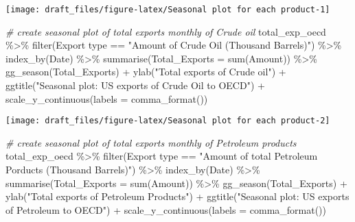 \documentclass[
]{article}
\newenvironment{Shaded}{\begin{snugshade}}{\end{snugshade}}
\newcommand{\AttributeTok}[1]{\textcolor[rgb]{0.77,0.63,0.00}{#1}}
\newcommand{\CommentTok}[1]{\textcolor[rgb]{0.56,0.35,0.01}{\textit{#1}}}
\newcommand{\FunctionTok}[1]{\textcolor[rgb]{0.00,0.00,0.00}{#1}}
\newcommand{\NormalTok}[1]{#1}
\newcommand{\SpecialCharTok}[1]{\textcolor[rgb]{0.00,0.00,0.00}{#1}}
\newcommand{\StringTok}[1]{\textcolor[rgb]{0.31,0.60,0.02}{#1}}
\begin{document}
\begin{center}\texttt{[image: draft\_files/figure-latex/Seasonal plot for each product-1]} \end{center}

\begin{Shaded}
\begin{Highlighting}[]
\CommentTok{\# create seasonal plot of total exports monthly of Crude oil}
\NormalTok{total\_exp\_oecd }\SpecialCharTok{\%\textgreater{}\%} \FunctionTok{filter}\NormalTok{(}\StringTok{\textasciigrave{}}\AttributeTok{Export type}\StringTok{\textasciigrave{}} \SpecialCharTok{==} \StringTok{"Amount of Crude Oil (Thousand Barrels)"}\NormalTok{) }\SpecialCharTok{\%\textgreater{}\%} 
  \FunctionTok{index\_by}\NormalTok{(Date) }\SpecialCharTok{\%\textgreater{}\%} 
  \FunctionTok{summarise}\NormalTok{(}\AttributeTok{Total\_Exports =} \FunctionTok{sum}\NormalTok{(}\StringTok{\textasciigrave{}}\AttributeTok{Amount}\StringTok{\textasciigrave{}}\NormalTok{)) }\SpecialCharTok{\%\textgreater{}\%} 
  \FunctionTok{gg\_season}\NormalTok{(Total\_Exports) }\SpecialCharTok{+}
  \FunctionTok{ylab}\NormalTok{(}\StringTok{"Total exports  of Crude oil"}\NormalTok{) }\SpecialCharTok{+}
  \FunctionTok{ggtitle}\NormalTok{(}\StringTok{"Seasonal plot: US exports of Crude Oil to OECD"}\NormalTok{) }\SpecialCharTok{+}
  \FunctionTok{scale\_y\_continuous}\NormalTok{(}\AttributeTok{labels =} \FunctionTok{comma\_format}\NormalTok{())}
\end{Highlighting}
\end{Shaded}

\begin{center}\texttt{[image: draft\_files/figure-latex/Seasonal plot for each product-2]} \end{center}

\begin{Shaded}
\begin{Highlighting}[]
\CommentTok{\# create seasonal plot of total exports monthly of Petroleum products}
\NormalTok{total\_exp\_oecd }\SpecialCharTok{\%\textgreater{}\%} \FunctionTok{filter}\NormalTok{(}\StringTok{\textasciigrave{}}\AttributeTok{Export type}\StringTok{\textasciigrave{}} \SpecialCharTok{==} \StringTok{"Amount of total Petroleum Porducts (Thousand Barrels)"}\NormalTok{) }\SpecialCharTok{\%\textgreater{}\%} 
  \FunctionTok{index\_by}\NormalTok{(Date) }\SpecialCharTok{\%\textgreater{}\%} 
  \FunctionTok{summarise}\NormalTok{(}\AttributeTok{Total\_Exports =} \FunctionTok{sum}\NormalTok{(}\StringTok{\textasciigrave{}}\AttributeTok{Amount}\StringTok{\textasciigrave{}}\NormalTok{)) }\SpecialCharTok{\%\textgreater{}\%} 
  \FunctionTok{gg\_season}\NormalTok{(Total\_Exports) }\SpecialCharTok{+}
  \FunctionTok{ylab}\NormalTok{(}\StringTok{"Total exports  of Petroleum Products"}\NormalTok{) }\SpecialCharTok{+}
  \FunctionTok{ggtitle}\NormalTok{(}\StringTok{"Seasonal plot: US exports of Petroleum to OECD"}\NormalTok{) }\SpecialCharTok{+}
  \FunctionTok{scale\_y\_continuous}\NormalTok{(}\AttributeTok{labels =} \FunctionTok{comma\_format}\NormalTok{())}
\end{Highlighting}
\end{Shaded}
\end{document}
